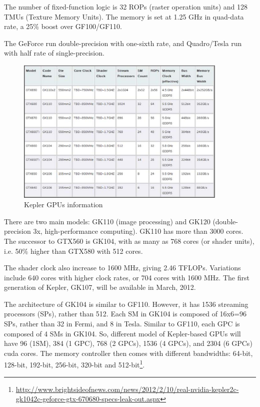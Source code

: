 The number of fixed-function logic is 32 ROPs (raster operation units) and 128
TMUs (Texture Memory Units). The memory is set at 1.25 GHz in quad-data rate, a
25\% boost over GF100/GF110. 

The GeForce run double-precision with one-sixth rate, and Quadro/Tesla run with
half rate of single-precision.

\begin{figure}[hbt]
  \centerline{\includegraphics[height=7cm,
    angle=0]{./images/Kepler_gpus.eps}}
  \caption{Kepler GPUs information}
  \label{fig:kepler_gpus}
\end{figure}

There are two main models: GK110 (image processing) and GK120 (double-precision
3x, high-performance computing). GK110 has more than 3000 cores.
The successor to GTX560 is GK104, with as many as 768 cores (or shader units),
i.e. 50\% higher than GTX580 with 512 cores. 


The shader clock also increase to 1600 MHz, giving 2.46 TFLOPs. Variations
include 640 cores with higher clock rates, or 704 cores with 1600 MHz. The first
generation of Kepler, GK107, will be available in March, 2012.

The architecture of GK104 is similar to GF110. However, it has 1536 streaming
processors (SPs), rather than 512. Each SM in GK104 is composed of 16x6=96 SPs,
rather than 32 in Fermi, and 8 in Tesla. Similar to GF110, each GPC is composed
of 4 SMs in GK104. So, different model of Kepler-based GPUs will have 96 (1SM),
384 (1 GPC), 768 (2 GPCs), 1536 (4 GPCs), and 2304 (6 GPCs) cuda cores. The
memory controller then comes with different bandwidths: 64-bit, 128-bit,
192-bit, 256-bit, 320-bit and
512-bit\footnote{\url{http://www.brightsideofnews.com/news/2012/2/10/real-nvidia-kepler2c-gk1042c-geforce-gtx-670680-specs-leak-out.aspx}}.


